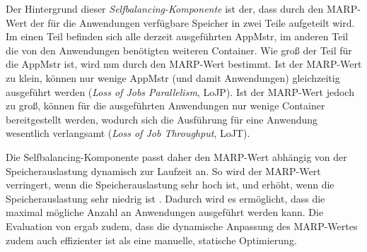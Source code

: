 Der Hintergrund dieser \emph{Selfbalancing-Komponente} ist der, dass durch den \ac{MARP}-Wert der für die Anwendungen verfügbare Speicher in zwei Teile aufgeteilt wird. Im einen Teil befinden sich alle derzeit ausgeführten \ac{AppMstr}, im anderen Teil die von den Anwendungen benötigten weiteren Container. Wie groß der Teil für die \ac{AppMstr} ist, wird nun durch den \ac{MARP}-Wert bestimmt. Ist der \ac{MARP}-Wert zu klein, können nur wenige \ac{AppMstr} (und damit Anwendungen) gleichzeitig ausgeführt werden (\emph{Loss of Jobs Parallelism}, LoJP). Ist der \ac{MARP}-Wert jedoch zu groß, können für die ausgeführten Anwendungen nur wenige Container bereitgestellt werden, wodurch sich die Ausführung für eine Anwendung wesentlich verlangsamt (\emph{Loss of Job Throughput}, LoJT)\cite{zhang2016}.

Die Selfbalancing-Komponente passt daher den \ac{MARP}-Wert abhängig von der Speicherauslastung dynamisch zur Laufzeit an. So wird der \ac{MARP}-Wert verringert, wenn die Speicherauslastung sehr hoch ist, und erhöht, wenn die Speicherauslastung sehr niedrig ist \cite{zhang2016}. Dadurch wird es ermöglicht, dass die maximal mögliche Anzahl an Anwendungen ausgeführt werden kann. Die Evaluation von \citeauthor{zhang2016} ergab zudem, dass die dynamische Anpassung des \ac{MARP}-Wertes zudem auch effizienter ist als eine manuelle, statische Optimierung.
